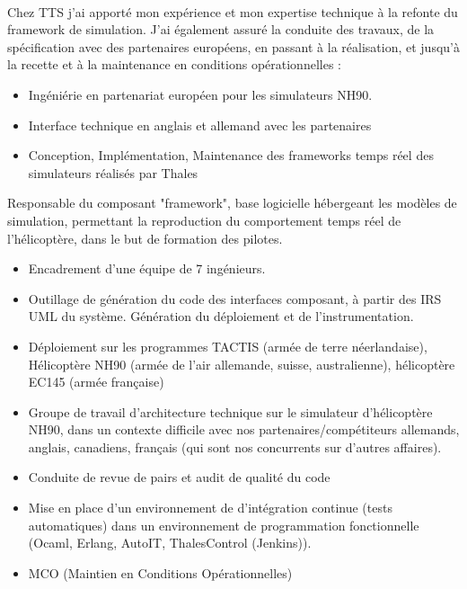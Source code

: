 \\[6pt]
Chez TTS j'ai apporté mon expérience et mon expertise technique à la refonte du framework de simulation. J'ai également assuré la conduite des travaux, de la spécification avec des partenaires européens, en passant à la réalisation, et jusqu'à la recette et à la maintenance en conditions opérationnelles :
\begin{itemize}
\item {Ingéniérie en partenariat européen pour les simulateurs NH90.}
\item {Interface technique en anglais et allemand avec les partenaires}
\item {Conception, Implémentation, Maintenance des frameworks temps réel des simulateurs réalisés par Thales}
\end{itemize}
\pagebreak
Responsable du composant "framework", base logicielle hébergeant les modèles de simulation, permettant la reproduction du comportement temps réel de l'hélicoptère, dans le but de formation des pilotes.
\begin{itemize}
\item{	Encadrement d’une équipe de 7 ingénieurs.}
\item{	Outillage de génération du code des interfaces composant, à partir des IRS UML du système. Génération du déploiement et de l’instrumentation.}
\item{Déploiement sur les programmes TACTIS (armée de terre néerlandaise), Hélicoptère NH90 (armée de l’air allemande, suisse, australienne), hélicoptère EC145 (armée française)}
\item{Groupe de travail d’architecture technique sur le simulateur d’hélicoptère NH90, dans un contexte difficile avec nos partenaires/compétiteurs allemands, anglais, canadiens, français (qui sont nos concurrents sur d’autres affaires).}
\item {Conduite de revue de pairs et audit de qualité du code}
\item {Mise en place d’un environnement de d’intégration continue (tests automatiques) dans un environnement de programmation fonctionnelle (Ocaml, Erlang, AutoIT, ThalesControl (Jenkins)).}
\item {MCO (Maintien en Conditions Opérationnelles)}
\end{itemize}